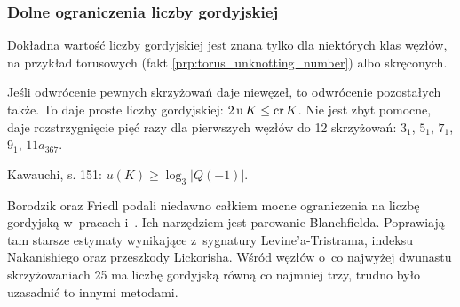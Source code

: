 
\subsubsection{Dolne ograniczenia liczby gordyjskiej}
Dokładna wartość liczby gordyjskiej jest znana tylko dla niektórych klas węzłów, na przykład torusowych (fakt \ref{prp:torus_unknotting_number}) albo skręconych.
%
%

Jeśli odwrócenie pewnych skrzyżowań daje niewęzeł, to odwrócenie pozostałych także.
To daje proste liczby gordyjskiej: $2 \operatorname{u} K \le \operatorname{cr} K$.
Nie jest zbyt pomocne, daje rozstrzygnięcie pięć razy dla pierwszych węzłów do 12 skrzyżowań: $3_{1}$, $5_{1}$, $7_{1}$, $9_{1}$, $11a_{367}$.

\begin{tobedone}
    Kawauchi, s. 151: $u(K) \ge \log_3|Q(-1)|$.
\end{tobedone}

Borodzik oraz Friedl podali niedawno całkiem mocne ograniczenia na liczbę gordyjską w~pracach \cite{borodzik14} i~\cite{borodzik15}.
%
%
Ich narzędziem jest parowanie Blanchfielda.
%
Poprawiają tam starsze estymaty wynikające z~sygnatury Levine'a-Tristrama, indeksu Nakanishiego oraz przeszkody Lickorisha.
%
%
%
Wśród węzłów o~co najwyżej dwunastu skrzyżowaniach 25 ma liczbę gordyjską równą co najmniej trzy, trudno było uzasadnić to innymi metodami.


